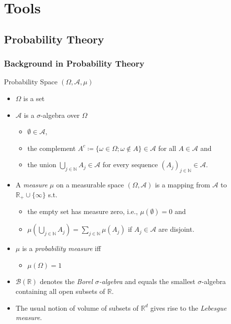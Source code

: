 \documentclass[oneside]{article}
\numberwithin{equation}{section}
\begin{document}
\appendix

\section{Tools}

\subsection{Probability Theory}

\subsubsection{Background in Probability Theory}
Probability Space $(\Omega,\mathcal{A},\mu)$
\begin{itemize}
    \item $\Omega$ is a set
    \item $\mathcal{A}$ is a $\sigma$-algebra over $\Omega$
    \begin{itemize}
        \item $\emptyset\in\mathcal{A}$,
        \item the complement $A^c\coloneqq\{\omega\in\Omega;\omega\notin A\}\in\mathcal{A}$ for all $A\in\mathcal{A}$ and
        \item the union $\bigcup_{j\in\mathbb{N}} A_j\in\mathcal{A}$ for every sequence $(A_j)_{j\in\mathbb{N}}\in\mathcal{A}$.
    \end{itemize}
    \item A \textit{measure} $\mu$ on a measurable space $(\Omega,\mathcal{A})$ is a mapping from $\mathcal{A}$ to $\mathbb{R}_+\cup\{\infty\}$ s.t.
    \begin{itemize}
        \item the empty set has measure zero, i.e., $\mu(\emptyset) = 0$ and
        \item $\mu\left(\bigcup_{j\in\mathbb{N}} A_j\right) = \sum_{j\in\mathbb{N}} \mu(A_j)$ if $A_j\in\mathcal{A}$ are disjoint.
    \end{itemize}
    \item $\mu$ is a \textit{probability measure} iff
    \begin{itemize}
        \item $\mu(\Omega) = 1$
    \end{itemize}
    \item $\mathcal{B}(\mathbb{R})$ denotes the \textit{Borel $\sigma$-algebra} and equals the smallest $\sigma$-algebra containing all open subsets of $\mathbb{R}$.
    \item The usual notion of volume of subsets of $\mathbb{R}^d$ gives rise to the \textit{Lebesgue measure}.
\end{itemize}
\end{document}
